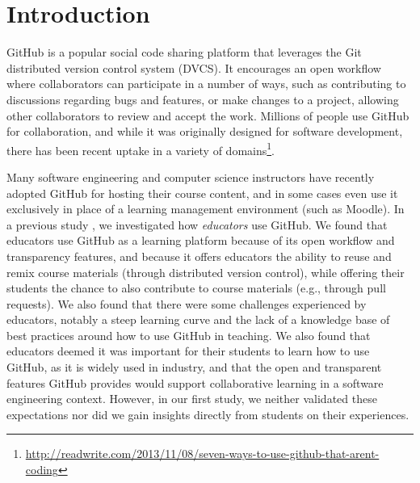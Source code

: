 \section{Introduction}


GitHub is a popular social code sharing platform that leverages the Git distributed version control system (DVCS). It encourages an open workflow where collaborators can participate in a number of ways, such as contributing to discussions regarding bugs and features, or make changes to a project, allowing other collaborators to review and accept the work.  Millions of people use GitHub for collaboration, and while it was originally designed for software development, there has been recent uptake in a variety of domains\footnote{\url{http://readwrite.com/2013/11/08/seven-ways-to-use-github-that-arent-coding}}. 

Many software engineering and computer science instructors have recently adopted GitHub for hosting their course content, and in some cases even use it exclusively in place of a learning management environment (such as Moodle).  In a previous study \cite{zagalsky2015emergence}, we investigated how \emph{educators} use GitHub. We found that educators use GitHub as a learning platform because of its open workflow and transparency features, and because it offers educators the ability to reuse and remix course materials (through distributed version control), while offering their students the chance to also contribute to course materials (e.g., through pull requests). We also found that there were some challenges experienced by educators, notably a steep learning curve and the lack of a knowledge base of best practices around how to use GitHub in teaching.  We also found that educators deemed it was important for their students to learn how to use GitHub, as it is widely used in industry, and that the open and transparent features GitHub provides would support collaborative learning in a software engineering context. However, in our first study, we neither validated these expectations nor did we gain insights directly from students on their experiences.  

